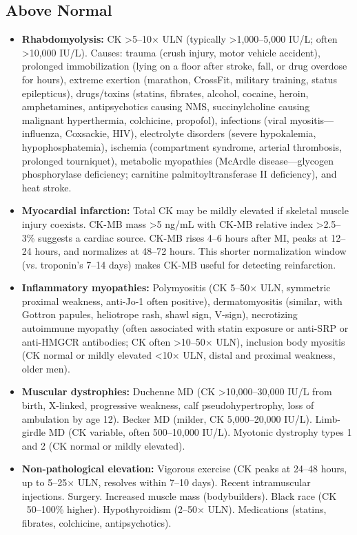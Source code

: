 \subsection*{Above Normal}
\begin{itemize}
  \item \textbf{Rhabdomyolysis:} CK >5--10$\times$ ULN (typically >1,000--5,000 IU/L; often >10,000 IU/L). Causes: trauma (crush injury, motor vehicle accident), prolonged immobilization (lying on a floor after stroke, fall, or drug overdose for hours), extreme exertion (marathon, CrossFit, military training, status epilepticus), drugs/toxins (statins, fibrates, alcohol, cocaine, heroin, amphetamines, antipsychotics causing NMS, succinylcholine causing malignant hyperthermia, colchicine, propofol), infections (viral myositis---influenza, Coxsackie, HIV), electrolyte disorders (severe hypokalemia, hypophosphatemia), ischemia (compartment syndrome, arterial thrombosis, prolonged tourniquet), metabolic myopathies (McArdle disease---glycogen phosphorylase deficiency; carnitine palmitoyltransferase II deficiency), and heat stroke.
  \item \textbf{Myocardial infarction:} Total CK may be mildly elevated if skeletal muscle injury coexists. CK-MB mass >5 ng/mL with CK-MB relative index >2.5--3\% suggests a cardiac source. CK-MB rises 4--6 hours after MI, peaks at 12--24 hours, and normalizes at 48--72 hours. This shorter normalization window (vs. troponin's 7--14 days) makes CK-MB useful for detecting reinfarction.
  \item \textbf{Inflammatory myopathies:} Polymyositis (CK 5--50$\times$ ULN, symmetric proximal weakness, anti-Jo-1 often positive), dermatomyositis (similar, with Gottron papules, heliotrope rash, shawl sign, V-sign), necrotizing autoimmune myopathy (often associated with statin exposure or anti-SRP or anti-HMGCR antibodies; CK often >10--50$\times$ ULN), inclusion body myositis (CK normal or mildly elevated <10$\times$ ULN, distal and proximal weakness, older men).
  \item \textbf{Muscular dystrophies:} Duchenne MD (CK >10,000--30,000 IU/L from birth, X-linked, progressive weakness, calf pseudohypertrophy, loss of ambulation by age 12). Becker MD (milder, CK 5,000--20,000 IU/L). Limb-girdle MD (CK variable, often 500--10,000 IU/L). Myotonic dystrophy types 1 and 2 (CK normal or mildly elevated).
  \item \textbf{Non-pathological elevation:} Vigorous exercise (CK peaks at 24--48 hours, up to 5--25$\times$ ULN, resolves within 7--10 days). Recent intramuscular injections. Surgery. Increased muscle mass (bodybuilders). Black race (CK ~50--100\% higher). Hypothyroidism (2--50$\times$ ULN). Medications (statins, fibrates, colchicine, antipsychotics).
\end{itemize}

